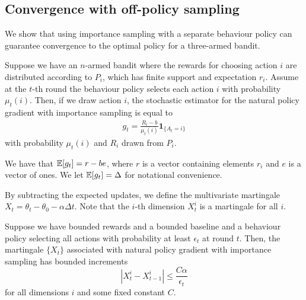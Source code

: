 \subsection{Convergence with off-policy sampling}
\label{app:3arm_off_policy}
We show that using importance sampling with a separate behaviour policy can guarantee convergence to the optimal policy for a three-armed bandit. 

Suppose we have an $n$-armed bandit where the rewards for choosing action $i$ are distributed according to $P_i$, which has finite support and expectation $r_i$. 
Assume at the $t$-th round the behaviour policy selects each action $i$ with probability $\mu_t(i)$.
Then, if we draw action $i$, the stochastic estimator for the natural policy gradient with importance sampling is equal to 
\begin{align*}
    g_t = \frac{R_i - b}{\mu_t (i)} \mathbf{1}_{\{A_t = i\} } 
\end{align*}
with probability $\mu_t(i)$ and $R_i$ drawn from $P_i$. 


We have that $\mathbb{E}[g_t] = r - be$, where $r$ is a vector containing elements $r_i$ and $e$ is a vector of ones. 
We let $\mathbb{E}[g_t] = \Delta$ for notational convenience.




By subtracting the expected updates, we define the multivariate martingale
$X_t = \theta_t - \theta_0 - \alpha \Delta t$. 
Note that the $i$-th dimension $X^{i}_t $ is a martingale for all $i$. 


\begin{lemma} Suppose we have bounded rewards and a bounded baseline and a behaviour policy selecting all actions with probability at least $\epsilon_t$ at round $t$. Then, the martingale $\{X_t\}$ associated with natural policy gradient with importance sampling has bounded increments
$$|X^{i}_t - X^{i}_{t-1}| \le \frac{C \alpha}{\epsilon_t}$$
for all dimensions $i$ and some fixed constant $C$.
\end{lemma}


